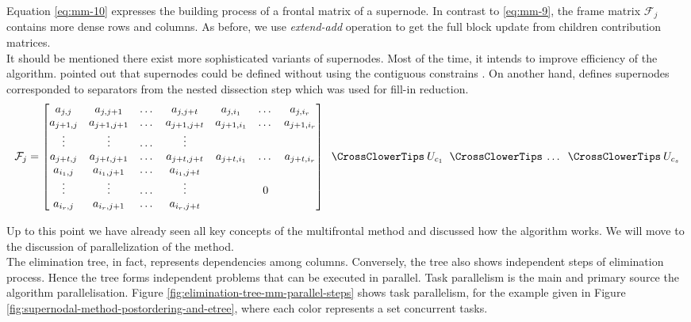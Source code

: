  
Equation \ref{eq:mm-10} expresses the building process of a frontal matrix of a supernode. In contrast to \ref{eq:mm-9}, the frame matrix $\mathcal{F}_{j}$ contains more dense rows and columns. As before, we use \textit{extend-add} operation to get the full block update from children contribution matrices.\\


It should be mentioned there exist more sophisticated variants of supernodes. Most of the time, it intends to improve efficiency of the algorithm. \citeauthor{mult-frontal-original:2} pointed out that supernodes could be defined without using the contiguous constrains \cite{mult-frontal-original:2}. On another hand, \citeauthor{complexity-of-spdm} defines supernodes corresponded to separators from the nested dissection step  \cite{complexity-of-spdm} which was used for fill-in reduction.\\



 \begin{equation} \label{eq:mm-10}
	\mathcal{F}_{j} = \begin{bmatrix}a_{j,j} & a_{j,j+1} & \dots & a_{j,j+t}  & a_{j,i_1} & \dots & a_{j,i_r} \\
a_{j+1,j} & a_{j+1,j+1} & \dots & a_{j+1,j+t}  & a_{j+1,i_1} & \dots & a_{j+1,i_r} \\
\vdots & \vdots & \dots & \vdots \\
a_{j+t,j}  & a_{j+t,j+1} & \dots & a_{j+t,j+t}  & a_{j+t,i_1} & \dots & a_{j+t,i_r} \\
a_{i_1,j} & a_{i_1,j+1} & \dots & a_{i_1,j+t} \\
\vdots & \vdots & \dots & \vdots  & & 0\\ 
a_{i_r,j} & a_{i_r,j+1} & \dots & a_{i_r,j+t} \\
\end{bmatrix} \extendadd U_{c_1} \extendadd \dots \extendadd U_{c_s} 
\end{equation}


Up to this point we have already seen all key concepts of the multifrontal method and discussed how the algorithm works. We will move to the discussion of parallelization of the method. \\


The elimination tree, in fact, represents dependencies among columns. Conversely, the tree also shows independent steps of elimination process. Hence the tree forms independent problems that can be executed in parallel. Task parallelism is the main and primary source the algorithm parallelisation. Figure \ref{fig:elimination-tree-mm-parallel-steps} shows task parallelism, for the example given in Figure \ref{fig:supernodal-method-postordering-and-etree}, where each color represents a set concurrent tasks.\\


